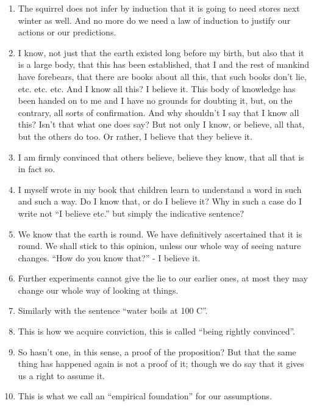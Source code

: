 \documentclass{book}
\begin{document}
\begin{enumerate}
\item
The squirrel does not infer by induction that it is going to need stores next
winter as well. And no more do we need a law of induction to justify our
actions or our predictions.

\item
I know, not just that the earth existed long before my birth, but also that it
is a large body, that this has been established, that I and the rest of mankind
have forebears, that there are books about all this, that such books don't lie,
etc. etc. etc. And I know all this? I believe it. This body of knowledge has
been handed on to me and I have no grounds for doubting it, but, on the
contrary, all sorts of confirmation.  And why shouldn't I say that I know all
this? Isn't that what one does say?  But not only I know, or believe, all that,
but the others do too. Or rather, I believe that they believe it.

\item
I am firmly convinced that others believe, believe they know, that all that is
in fact so.

\item
I myself wrote in my book that children learn to understand a word in such and
such a way. Do I know that, or do I believe it? Why in such a case do I write
not ``I believe etc.'' but simply the indicative sentence?

\item
We know that the earth is round. We have definitively ascertained that it is
round.  We shall stick to this opinion, unless our whole way of seeing nature
changes. ``How do you know that?'' - I believe it.

\item
Further experiments cannot give the lie to our earlier ones, at most they may
change our whole way of looking at things.

\item
Similarly with the sentence ``water boils at 100 C''.

\item
This is how we acquire conviction, this is called ``being rightly convinced''.

\item
So hasn't one, in this sense, a proof of the proposition? But that the same
thing has happened again is not a proof of it; though we do say that it gives
us a right to assume it.

\item
This is what we call an ``empirical foundation'' for our assumptions.


\end{enumerate}
\end{document}
